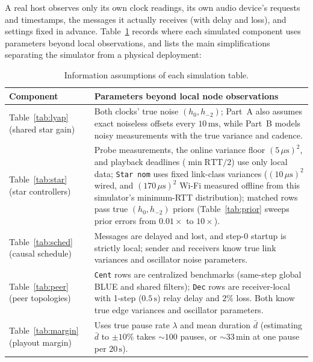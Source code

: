 \documentclass[11pt,a4paper]{article}
\theoremstyle{definition}
\begin{document}
A real host observes only its own clock readings, its own audio device's
requests and timestamps, the messages it actually receives (with delay and
loss), and settings fixed in advance. Table~\ref{tab:info} records where each
simulated component uses parameters beyond local observations, and lists the
main simplifications separating the simulator from a physical deployment:

\begin{table}[htb]
\centering
\small
\begin{tabular}{@{}l >{\raggedright\arraybackslash}p{8.8cm}@{}}
\toprule
Component & Parameters beyond local node observations \\
\midrule
Table~\ref{tab:lyap} (shared star gain) &
  Both clocks' true noise $(h_0, h_{-2})$; Part~A also assumes exact
  noiseless offsets every $10\,\text{ms}$, while Part~B models noisy
  measurements with the true variance and cadence. \\
Table~\ref{tab:star} (star controllers) &
  Probe measurements, the online variance floor $(5\,\mu\text{s})^2$, and
  playback deadlines ($\min\mathrm{RTT}/2$) use only local data;
  \texttt{Star nom} uses fixed link-class variances ($(10\,\mu\text{s})^2$ wired,
  and $(170\,\mu\text{s})^2$ Wi-Fi measured offline from this simulator's
  minimum-RTT distribution); matched rows pass true $(h_0, h_{-2})$ priors
  (Table~\ref{tab:prior} sweeps prior errors from $0.01\times$ to $10\times$). \\
Table~\ref{tab:sched} (causal schedule) &
  Messages are delayed and lost, and step-0 startup is strictly local; sender
  and receivers know true link variances and oscillator noise parameters. \\
Table~\ref{tab:peer} (peer topologies) &
  \texttt{Cent} rows are centralized benchmarks (same-step global BLUE and
  shared filters); \texttt{Dec} rows are receiver-local with 1-step ($0.5\,\text{s}$)
  relay delay and $2\%$ loss. Both know true edge variances and oscillator
  parameters. \\
Table~\ref{tab:margin} (playout margin) &
  Uses true pause rate $\lambda$ and mean duration $\bar d$ (estimating $\bar d$
  to $\pm 10\%$ takes $\sim 100$ pauses, or $\sim 33\,\text{min}$ at one pause
  per $20\,\text{s}$). \\
\bottomrule
\end{tabular}
\caption{Information assumptions of each simulation table.}
\label{tab:info}
\end{table}
\end{document}

